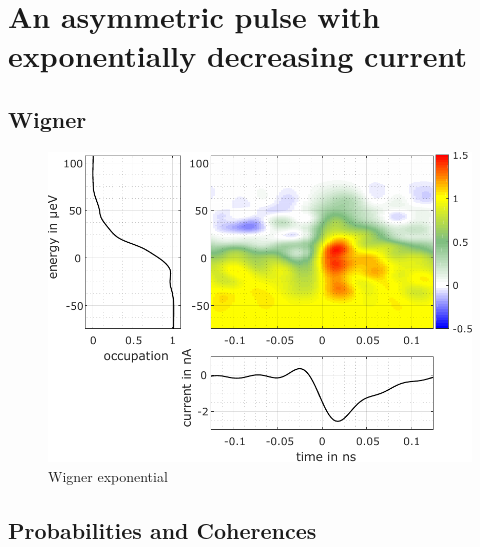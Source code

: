 \section{An asymmetric pulse with exponentially decreasing current \label{sec: An asymetric pulse with exponentially decreasing current}}

\subsection{Wigner}

\begin{figure}[hptb]
	\begin{center}
		\includegraphics[width = 10 cm]{./appC/wigData_exponential_50ps_1e_JMAP_f_vf} 
	\end{center}
	
	\caption{Wigner exponential}
	\label{fig: Wigner exponential}
\end{figure}

\subsection{Probabilities and Coherences}

